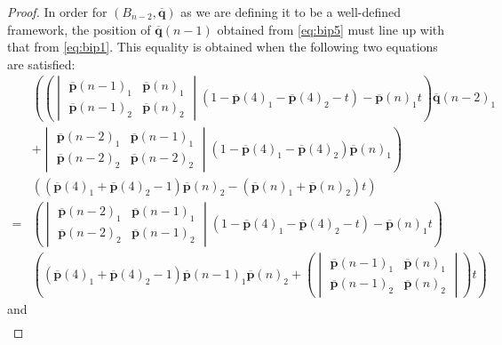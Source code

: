 \documentclass[11pt]{amsart}
\theoremstyle{definition}
\theoremstyle{remark}
\begin{document}
\begin{proof}
    In order for $(B_{n-2},\overline{\mathbf{q}})$ as we are defining it to be a well-defined framework, the position of $\overline{\mathbf{q}}(n-1)$ obtained from \cref{eq:bip5} must line up with that from \cref{eq:bip1}.
    This equality is obtained when the following two equations are satisfied:
    \begin{equation}\label{eq:bip6}
    \begin{split}
        &\left(\left( \begin{vmatrix} \overline{\mathbf{p}}(n-1)_1 & \overline{\mathbf{p}}(n)_1 \\ \overline{\mathbf{p}}(n-1)_2 & \overline{\mathbf{p}}(n)_2 \end{vmatrix} (1-\overline{\mathbf{p}}(4)_1 - \overline{\mathbf{p}}(4)_2 -t) - \overline{\mathbf{p}}(n)_1t \right)\overline{\mathbf{q}}(n-2)_1\right.\\
        &+\left. \begin{vmatrix} \overline{\mathbf{p}}(n-2)_1 & \overline{\mathbf{p}}(n-1)_1 \\ \overline{\mathbf{p}}(n-2)_2 & \overline{\mathbf{p}}(n-2)_2 \end{vmatrix} (1-\overline{\mathbf{p}}(4)_1-\overline{\mathbf{p}}(4)_2)\overline{\mathbf{p}}(n)_1 \right) \\
        &((\overline{\mathbf{p}}(4)_1+\overline{\mathbf{p}}(4)_2 - 1)\overline{\mathbf{p}}(n)_2 - (\overline{\mathbf{p}}(n)_1+\overline{\mathbf{p}}(n)_2)t) \\
        =& \left( \begin{vmatrix} \overline{\mathbf{p}}(n-2)_1 & \overline{\mathbf{p}}(n-1)_1 \\ \overline{\mathbf{p}}(n-2)_2 & \overline{\mathbf{p}}(n-1)_2 \end{vmatrix} (1-\overline{\mathbf{p}}(4)_1-\overline{\mathbf{p}}(4)_2-t) - \overline{\mathbf{p}}(n)_1t \right) \\
        &\left( (\overline{\mathbf{p}}(4)_1+\overline{\mathbf{p}}(4)_2-1)\overline{\mathbf{p}}(n-1)_1\overline{\mathbf{p}}(n)_2 + \left(\begin{vmatrix} \overline{\mathbf{p}}(n-1)_1 & \overline{\mathbf{p}}(n)_1 \\ \overline{\mathbf{p}}(n-1)_2 & \overline{\mathbf{p}}(n)_2 \end{vmatrix}\right)t \right)
    \end{split}
    \end{equation}
    and
    \begin{equation}\label{eq:bip7}
    \begin{split}

\end{split}
\end{equation}
\end{proof}
\end{document}
